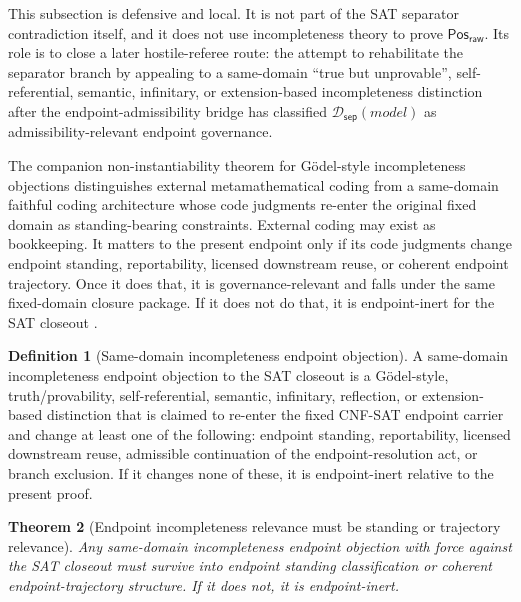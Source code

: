 \documentclass[11pt]{article}
\newtheorem{theorem}{Theorem}[section]
\theoremstyle{definition}
\newtheorem{definition}[theorem]{Definition}
\theoremstyle{remark}
\newcommand{\PosRaw}{\mathsf{Pos}_{\mathsf{raw}}}
\newcommand{\SepDisc}{\mathcal{D}_{\mathsf{sep}}}
\begin{document}
This subsection is defensive and local. It is not part of the SAT separator contradiction itself, and it does not use incompleteness theory to prove \(\PosRaw\). Its role is to close a later hostile-referee route: the attempt to rehabilitate the separator branch by appealing to a same-domain ``true but unprovable'', self-referential, semantic, infinitary, or extension-based incompleteness distinction after the endpoint-admissibility bridge has classified \(\SepDisc(model)\) as admissibility-relevant endpoint governance.

The companion non-instantiability theorem for G\"odel-style incompleteness objections distinguishes external metamathematical coding from a same-domain faithful coding architecture whose code judgments re-enter the original fixed domain as standing-bearing constraints. External coding may exist as bookkeeping. It matters to the present endpoint only if its code judgments change endpoint standing, reportability, licensed downstream reuse, or coherent endpoint trajectory. Once it does that, it is governance-relevant and falls under the same fixed-domain closure package. If it does not do that, it is endpoint-inert for the SAT closeout \cite{GodelNonInstantiability}.

\begin{definition}[Same-domain incompleteness endpoint objection]\label{def:same-domain-incompleteness-endpoint-objection}
A same-domain incompleteness endpoint objection to the SAT closeout is a G\"odel-style, truth/provability, self-referential, semantic, infinitary, reflection, or extension-based distinction that is claimed to re-enter the fixed CNF-SAT endpoint carrier and change at least one of the following: endpoint standing, reportability, licensed downstream reuse, admissible continuation of the endpoint-resolution act, or branch exclusion. If it changes none of these, it is endpoint-inert relative to the present proof.
\end{definition}

\begin{theorem}[Endpoint incompleteness relevance must be standing or trajectory relevance]\label{thm:endpoint-incompleteness-relevance-standing-trajectory}
Any same-domain incompleteness endpoint objection with force against the SAT closeout must survive into endpoint standing classification or coherent endpoint-trajectory structure. If it does not, it is endpoint-inert.
\end{theorem}
\end{document}
